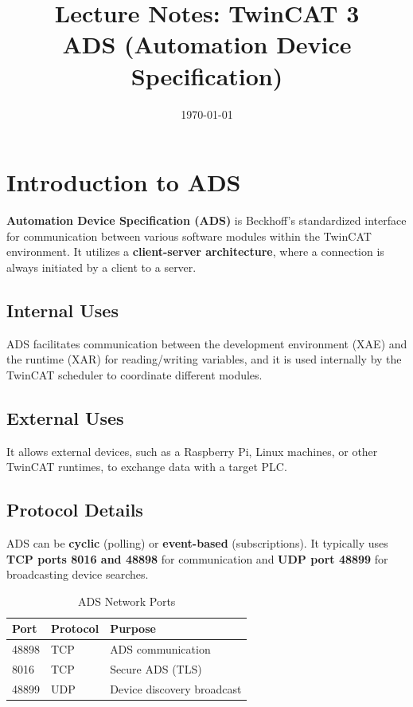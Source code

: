 \documentclass[11pt,a4paper]{article}
\title{
    \vspace{-1cm}
    \textbf{Lecture Notes: TwinCAT 3}\\
    \Large ADS (Automation Device Specification)
}
\author{}
\date{\today}
\begin{document}
\maketitle

\tableofcontents
\newpage

\section{Introduction to ADS}

\textbf{Automation Device Specification (ADS)} is Beckhoff's standardized interface for communication between various software modules within the TwinCAT environment. It utilizes a \textbf{client-server architecture}, where a connection is always initiated by a client to a server.

\subsection{Internal Uses}

ADS facilitates communication between the development environment (XAE) and the runtime (XAR) for reading/writing variables, and it is used internally by the TwinCAT scheduler to coordinate different modules.

\subsection{External Uses}

It allows external devices, such as a Raspberry Pi, Linux machines, or other TwinCAT runtimes, to exchange data with a target PLC.

\subsection{Protocol Details}

ADS can be \textbf{cyclic} (polling) or \textbf{event-based} (subscriptions). It typically uses \textbf{TCP ports 8016 and 48898} for communication and \textbf{UDP port 48899} for broadcasting device searches.

\begin{table}[h]
\centering
\begin{tabular}{@{}lll@{}}
\toprule
\textbf{Port} & \textbf{Protocol} & \textbf{Purpose} \\
\midrule
48898 & TCP & ADS communication \\
8016 & TCP & Secure ADS (TLS) \\
48899 & UDP & Device discovery broadcast \\
\bottomrule
\end{tabular}
\caption{ADS Network Ports}
\end{table}
\end{document}
